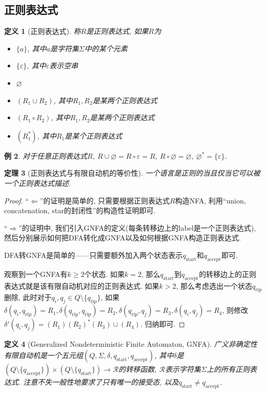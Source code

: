 \documentclass[8pt]{article}
\theoremstyle{compact}
\newtheorem{theorem}{定理}[section]
\newtheorem{definition}[theorem]{定义}
\newtheorem{example}[theorem]{例}
\def\ge{\geqslant}
\begin{document}
\subsection{正则表达式}
\begin{definition}[正则表达式]
	称$R$是正则表达式, 如果$R$为
	\begin{itemize}
		\item $\{a\}$, 其中$a$是字符集$\Sigma$中的某个元素
		\item $\{\varepsilon\}$, 其中$\varepsilon$表示空串
		\item $\varnothing$
		\item $(R_1 \cup R_2)$, 其中$R_1, R_2$是某两个正则表达式
		\item $(R_1 \circ R_2)$, 其中$R_1, R_2$是某两个正则表达式
		\item $(R_1^*)$, 其中$R_1$是某个正则表达式
	\end{itemize}
\end{definition}
\begin{example}
	对于任意正则表达式$R$, $R \cup \varnothing = R \circ \varepsilon = R$, $R \circ \varnothing = \varnothing$, $\varnothing^* = \{\varepsilon\}$. 
\end{example}
\begin{theorem}[正则表达式与有限自动机的等价性]
	一个语言是正则的当且仅当它可以被一个正则表达式描述. 
\end{theorem}
\begin{proof}
	“$\Leftarrow$”的证明是简单的, 只需要根据正则表达式$R$构造NFA, 利用“union, concatenation, star的封闭性”的构造性证明即可. 

	“$\Rightarrow$”的证明中, 我们引入GNFA的定义(每条转移边上的label是一个正则表达式), 然后分别展示如何把DFA转化成GNFA以及如何根据GNFA构造正则表达式. 

	DFA转GNFA是简单的——只需要额外加入两个状态表示$q_{\text{start}}$和$q_{\text{accept}}$即可. 

	观察到一个GNFA有$k \ge 2$个状态. 如果$k=2$, 那么$q_{\text{start}}$到$q_{\text{accept}}$的转移边上的正则表达式就是该有限自动机对应的正则表达式. 如果$k > 2$, 那么考虑选出一个状态$q_{\text{rip}}$删除, 此时对于$q_i, q_j \in Q \setminus \{q_{\text{rip}}\}$, 如果$\delta(q_i,  q_{\text{rip}}) = R_1, \delta(q_{\text{rip}}, q_{\text{rip}}) = R_2, \delta(q_{\text{rip}}, q_j) = R_3, \delta(q_i, q_j) = R_4$, 则修改$\delta'(q_i, q_j) = (R_1)(R_2)^*(R_3) \cup (R_4)$. 归纳即可. 
\end{proof}
\begin{definition}[Generalized Nondeterministic Finite Automaton, GNFA]
	广义非确定性有限自动机是一个五元组$(Q, \Sigma, \delta, q_{\text{start}}, q_{\text{accept}})$, 其中$\delta$是$(Q \setminus \{q_{\text{accept}}\}) \times (Q \setminus \{q_{\text{start}}\}) \to \mathcal R$的转移函数, $\mathcal R$表示字符集$\Sigma$上的所有正则表达式. 注意不失一般性地要求了只有唯一的接受态, 以及$q_{\text{start}} \neq q_{\text{accept}}$. 
\end{definition}
\end{document}
